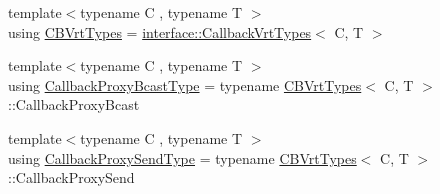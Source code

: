 \begin{DoxyCompactItemize}
\item 
{\footnotesize template$<$typename C , typename T $>$ }\\using \hyperlink{structvt_1_1pipe_1_1_pipe_manager_typed_abb75b2bfdb23ebfa7f4f677a7f4bcb77}{C\+B\+Vrt\+Types} = \hyperlink{structvt_1_1pipe_1_1interface_1_1_callback_vrt_types}{interface\+::\+Callback\+Vrt\+Types}$<$ C, T $>$
\item 
{\footnotesize template$<$typename C , typename T $>$ }\\using \hyperlink{structvt_1_1pipe_1_1_pipe_manager_typed_a74e5f1a359ab32259f855998f867d93a}{Callback\+Proxy\+Bcast\+Type} = typename \hyperlink{structvt_1_1pipe_1_1_pipe_manager_typed_abb75b2bfdb23ebfa7f4f677a7f4bcb77}{C\+B\+Vrt\+Types}$<$ C, T $>$\+::Callback\+Proxy\+Bcast
\item 
{\footnotesize template$<$typename C , typename T $>$ }\\using \hyperlink{structvt_1_1pipe_1_1_pipe_manager_typed_a9259903ba569c54c4e4bc6ad7888e059}{Callback\+Proxy\+Send\+Type} = typename \hyperlink{structvt_1_1pipe_1_1_pipe_manager_typed_abb75b2bfdb23ebfa7f4f677a7f4bcb77}{C\+B\+Vrt\+Types}$<$ C, T $>$\+::Callback\+Proxy\+Send
\end{DoxyCompactItemize}
